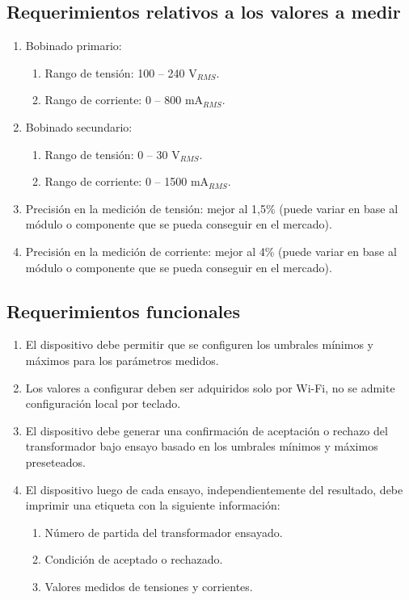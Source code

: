 \subsection{Requerimientos relativos a los valores a medir}
	\begin{enumerate}
	\item Bobinado primario:
		\begin{enumerate}
		\item Rango de tensión: 100 – 240 V$_{RMS}$.
		\item Rango de corriente: 0 – 800 mA$_{RMS}$.
		\end{enumerate}
	\item Bobinado secundario:
		\begin{enumerate}
		\item Rango de tensión: 0 – 30 V$_{RMS}$.
		\item Rango de corriente: 0 – 1500 mA$_{RMS}$.
		\end{enumerate}
	\item Precisión en la medición de tensión: mejor al 1,5\% (puede variar en base al módulo o componente que se pueda conseguir en el mercado).
	\item Precisión en la medición de corriente: mejor al 4\% (puede variar en base al módulo o componente que se pueda conseguir en el mercado).
	\end{enumerate}
\subsection{Requerimientos funcionales}
\label{subsec:ReqFun}
	\begin{enumerate}
	\item El dispositivo debe permitir que se configuren los umbrales mínimos y máximos para los parámetros medidos. 
	\item Los valores a configurar deben ser adquiridos solo por Wi-Fi, no se admite configuración local por teclado.
	\item El dispositivo debe generar una confirmación de aceptación o rechazo del transformador bajo ensayo basado en los umbrales mínimos y máximos preseteados.
	\item El dispositivo luego de cada ensayo, independientemente del resultado, debe imprimir una etiqueta con la siguiente información:
		\begin{enumerate}
		\item Número de partida del transformador ensayado.
		\item Condición de aceptado o rechazado.
		\item Valores medidos de tensiones y corrientes.
		\end{enumerate}
	\end{enumerate}	
